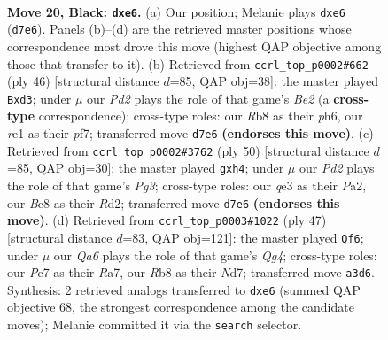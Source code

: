\documentclass[11pt]{article}
\begin{document}
\clearpage

\begin{figure}[p]\centering
\begin{subfigure}{0.46\textwidth}\centering
\resizebox{\linewidth}{!}{%
\newchessgame
\chessboard[
  setfen={1rb1k2r/p1pp1pp1/2p1P2p/8/8/q2BQ3/P1P5/R2KR3 b k - 0 20},
  showmover=false,
  pgfstyle=straightmove, color=movearrow, markmove={d7-e6}
]}
\caption{}
\end{subfigure}\hfill
\begin{subfigure}{0.46\textwidth}\centering
\resizebox{\linewidth}{!}{%
\newchessgame
\chessboard[
  setfen={r5k1/1b2qpp1/1Q5p/p7/8/P2pP2P/4BPP1/2R3K1 w - - 0 24},
  showmover=false,
  pgfstyle=straightmove, color=movearrow, markmove={e2-d3}
]}
\caption{}
\end{subfigure}
\\[4pt]
\begin{subfigure}{0.46\textwidth}\centering
\resizebox{\linewidth}{!}{%
\newchessgame
\chessboard[
  setfen={4k2r/pq2bpQ1/1p2pp2/8/2P4r/1PB3P1/P2R1P2/6K1 w k - 0 26},
  showmover=false,
  pgfstyle=straightmove, color=movearrow, markmove={g3-h4}
]}
\caption{}
\end{subfigure}\hfill
\begin{subfigure}{0.46\textwidth}\centering
\resizebox{\linewidth}{!}{%
\newchessgame
\chessboard[
  setfen={4r1k1/r2n1pp1/4p2p/2pP2q1/8/4PP2/2Q2PBP/2RR2K1 b - - 4 24},
  showmover=false,
  pgfstyle=straightmove, color=movearrow, markmove={g5-f6}
]}
\caption{}
\end{subfigure}
\caption{\textbf{Move 20, Black: \texttt{dxe6}.} (a) Our position; Melanie plays \texttt{dxe6} (\texttt{d7e6}). Panels (b)--(d) are the retrieved master positions whose correspondence most drove this move (highest QAP objective among those that transfer to it). (b) Retrieved from \texttt{ccrl\_top\_p0002\#662} (ply 46) [structural distance $d$=85, QAP obj=38]: the master played \texttt{Bxd3}; under $\mu$ our \emph{Pd2} plays the role of that game's \emph{Be2} (a \textbf{cross-type} correspondence); cross-type roles: our \emph{R}b8 as their \emph{p}h6, our \emph{r}e1 as their \emph{p}f7; transferred move \texttt{d7e6} \textbf{(endorses this move)}. (c) Retrieved from \texttt{ccrl\_top\_p0002\#3762} (ply 50) [structural distance $d$=85, QAP obj=30]: the master played \texttt{gxh4}; under $\mu$ our \emph{Pd2} plays the role of that game's \emph{Pg3}; cross-type roles: our \emph{q}e3 as their \emph{P}a2, our \emph{B}c8 as their \emph{R}d2; transferred move \texttt{d7e6} \textbf{(endorses this move)}. (d) Retrieved from \texttt{ccrl\_top\_p0003\#1022} (ply 47) [structural distance $d$=83, QAP obj=121]: the master played \texttt{Qf6}; under $\mu$ our \emph{Qa6} plays the role of that game's \emph{Qg4}; cross-type roles: our \emph{P}c7 as their \emph{R}a7, our \emph{R}b8 as their \emph{N}d7; transferred move \texttt{a3d6}. Synthesis: 2 retrieved analogs transferred to \texttt{dxe6} (summed QAP objective 68, the strongest correspondence among the candidate moves); Melanie committed it via the \texttt{search} selector.}
\label{fig:thought-m39}
\end{figure}
\end{document}
